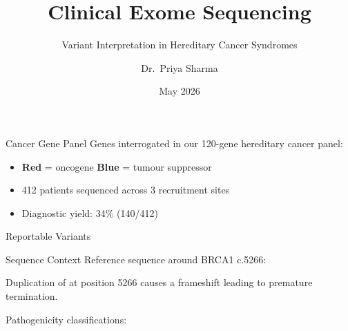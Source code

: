 \documentclass[palette=genome]{rossbeamergenomics}
\title{Clinical Exome Sequencing}
\subtitle{Variant Interpretation in Hereditary Cancer Syndromes}
\author{Dr.~Priya Sharma}
\institute{Genomic Medicine Centre, NHS England}
\date{May 2026}
\begin{document}
\begin{frame}[plain]
  \titlepage
\end{frame}

\begin{frame}{Cancer Gene Panel}
  Genes interrogated in our 120-gene hereditary cancer panel:

  \vskip8pt
  \quad
  \quad
  \quad
  \quad
  \quad
  \quad

  \vskip12pt
  \begin{itemize}
    \item \textbf{Red} = oncogene \quad \textbf{Blue} = tumour suppressor
    \item 412 patients sequenced across 3 recruitment sites
    \item Diagnostic yield: 34\% (140/412)
  \end{itemize}
\end{frame}

\begin{frame}{Reportable Variants}
  \vskip6pt
  \vskip6pt
\end{frame}

\begin{frame}{Sequence Context}
  Reference sequence around BRCA1 c.5266:

  \vskip8pt
  \centering
  {\Large\ttfamily
    {\color{rbAlertRed}\underline{}}%
  }

  \vskip6pt
  {\small\color{rbTextMuted}%
    Duplication of  at position 5266 causes a frameshift
    leading to premature termination.}

  \vskip12pt
  Pathogenicity classifications:\par\vskip4pt
  \quad
  \quad
  \quad
  \quad
\end{frame}
\end{document}
